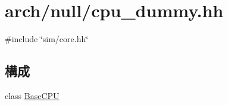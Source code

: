 \hypertarget{cpu__dummy_8hh}{
\section{arch/null/cpu\_\-dummy.hh}
\label{cpu__dummy_8hh}
}
{\ttfamily \#include \char`\"{}sim/core.hh\char`\"{}}\par
\subsection*{構成}
\begin{DoxyCompactItemize}
\item 
class \hyperlink{classBaseCPU}{BaseCPU}
\end{DoxyCompactItemize}
